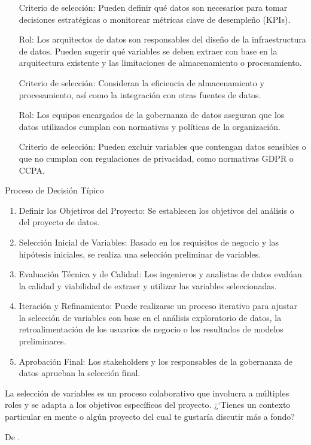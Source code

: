 \begin{description}
\begin{itemize}
            \item[Criterio de selecci\'on: ] Pueden definir qu\'e datos son necesarios para tomar decisiones estrat\'egicas o monitorear m\'etricas clave de desemple\~no (KPIs).
        \end{itemize}
    \item[Arquitectos de Datos: ]
        \begin{itemize}
            \item[Rol: ] Los arquitectos de datos son responsables del dise\~no de la infraestructura de datos. Pueden sugerir qu\'e variables se deben extraer con base en la arquitectura existente y las limitaciones de almacenamiento o procesamiento.
            \item[Criterio de selecci\'on: ] Consideran la eficiencia de almacenamiento y procesamiento, as\'i como la integraci\'on con otras fuentes de datos.
        \end{itemize}
    \item[Gobernanza de Datos: ]
        \begin{itemize}
            \item[Rol: ] Los equipos encargados de la gobernanza de datos aseguran que los datos utilizados cumplan con normativas y pol\'iticas de la organizaci\'on.
            \item[Criterio de selecci\'on: ] Pueden excluir variables que contengan datos sensibles o que no cumplan con regulaciones de privacidad, como normativas GDPR o CCPA.
        \end{itemize}
\end{description}    

Proceso de Decisi\'on T\'ipico
\begin{enumerate}
    \item Definir los Objetivos del Proyecto: Se establecen los objetivos del an\'alisis o del proyecto de datos.
    \item Selecci\'on Inicial de Variables: Basado en los requisitos de negocio y las hip\'otesis iniciales, se realiza una selecci\'on preliminar de variables.
    \item Evaluaci\'on Técnica y de Calidad: Los ingenieros y analistas de datos evalúan la calidad y viabilidad de extraer y utilizar las variables seleccionadas.
    \item Iteraci\'on y Refinamiento: Puede realizarse un proceso iterativo para ajustar la selecci\'on de variables con base en el an\'alisis exploratorio de datos, la retroalimentaci\'on de los usuarios de negocio o los resultados de modelos preliminares.
    \item Aprobaci\'on Final: Los stakeholders y los responsables de la gobernanza de datos aprueban la selecci\'on final.
\end{enumerate}
La selecci\'on de variables es un proceso colaborativo que involucra a m\'ultiples roles y se adapta a los objetivos espec\'ificos del proyecto. ¿`Tienes un contexto particular en mente o alg\'un proyecto del cual te gustar\'ia discutir m\'as a fondo?

De \cite{OpenAI}.